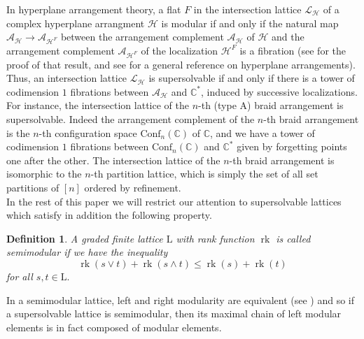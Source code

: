 \documentclass[11pt,a4paper]{amsart}
\theoremstyle{results}
\theoremstyle{definitions}
\newtheorem{definition}[thm]{Definition}
\def\C{\mathbb{C}}
\newcommand{\rk}{\operatorname{rk}}
\renewcommand{\L}{\mathcal{L}}
\newcommand{\Latt}{\mathrm{L}}
\renewcommand{\L}{\mathcal{L}}
\newcommand{\Harr}{\mathcal{H}}
\newcommand{\Arr}{\mathcal{A}}
\newcommand{\Conf}{\mathrm{Conf}}
\begin{document}
In hyperplane arrangement theory, a flat $F$ in the intersection lattice $\L_{\Harr}$ of a complex hyperplane arrangment $\Harr$ is modular if and only if the natural map $\Arr_{\Harr} \rightarrow \Arr_{\Harr^F}$ between the arrangement complement $\Arr_{\Harr}$ of $\Harr$ and the arrangement complement $\Arr_{\Harr^F}$ of the localization $\Harr^F$ is a fibration (see \cite{Paris_2000} for the proof of that result, and see \cite{OT_1992} for a general reference on hyperplane arrangements). Thus, an intersection lattice $\L_{\Harr}$ is supersolvable if and only if there is a tower of codimension $1$ fibrations between $\Arr_{\Harr}$ and $\C^{\ast}$, induced by successive localizations. For instance, the intersection lattice of the $n$-th (type A) braid arrangement is supersolvable. Indeed the arrangement complement of the $n$-th braid arrangement is the $n$-th configuration space $\Conf_n(\C)$ of $\C$, and we have a tower of codimension $1$ fibrations between $\Conf_n(\C)$ and $\C^{\ast}$ given by forgetting points one after the other. The intersection lattice of the $n$-th braid arrangement is isomorphic to the $n$-th partition lattice, which is simply the set of all set partitions of $[n]$ ordered by refinement. \\

In the rest of this paper we will restrict our attention to supersolvable lattices which satisfy in addition the following property. 
\begin{definition}\label{def:semimodular}
A graded finite lattice $\Latt$ with rank function $\rk$ is called semimodular if we have the inequality 
$$\rk(s\vee t) + \rk(s\wedge t) \leq \rk(s) + \rk(t)$$
for all $s,t \in \Latt.$
\end{definition}
In a semimodular lattice, left and right modularity are equivalent (see \cite[p. 83]{birkhoff1940lattice}) and so if a supersolvable lattice is semimodular, then its maximal chain of left modular elements is in fact composed of modular elements. \\
\end{document}
